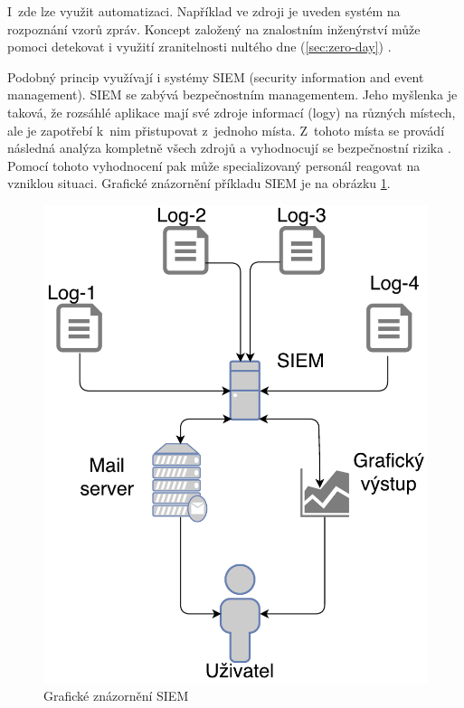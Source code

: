 \documentclass[thesis=M,czech]{FITthesis}[2012/10/20]
\newcommand{\tmpframe}[1]{\fbox{#1}}
\renewcommand{\tmpframe}[1]{#1}
\begin{document}
				I~zde lze využit automatizaci. Například ve zdroji \cite{CoronaGiacintoDetWebAtt} je uveden systém na rozpoznání vzorů zpráv. Koncept založený na znalostním inženýrství může pomoci detekovat i využití zranitelnosti nultého dne (\ref{sec:zero-day}) \cite{AhnKimChungBigDataAnal}.
				
				Podobný princip využívají i systémy SIEM (security information and event management). SIEM se zabývá bezpečnostním managementem. Jeho myšlenka je taková, že rozsáhlé aplikace mají své zdroje informací (logy) na různých místech, ale je zapotřebí k~nim přistupovat z~jednoho místa. Z~tohoto místa se provádí následná analýza kompletně všech zdrojů a vyhodnocují se bezpečnostní rizika \cite{SIEMDef}. Pomocí tohoto vyhodnocení pak může specializovaný personál reagovat na vzniklou situaci. Grafické znázornění příkladu SIEM je na obrázku \ref{fig:siem}.
				
				\begin{figure}[htb]\centering
					\tmpframe{\includegraphics[scale=0.5]{./img/SIEM}}		
					\caption{Grafické znázornění SIEM}
					\label{fig:siem}
				\end{figure}
			
\end{document}
